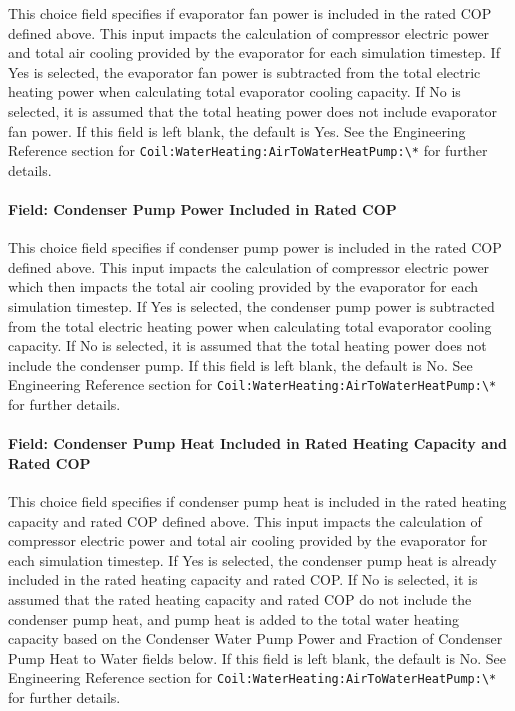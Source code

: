 This choice field specifies if evaporator fan power is included in the rated COP defined above. This input impacts the calculation of compressor electric power and total air cooling provided by the evaporator for each simulation timestep. If Yes is selected, the evaporator fan power is subtracted from the total electric heating power when calculating total evaporator cooling capacity. If No is selected, it is assumed that the total heating power does not include evaporator fan power. If this field is left blank, the default is Yes. See the Engineering Reference section for \lstinline!Coil:WaterHeating:AirToWaterHeatPump:\*! for further details.

\paragraph{Field: Condenser Pump Power Included in Rated COP}\label{field-condenser-pump-power-included-in-rated-cop}

This choice field specifies if condenser pump power is included in the rated COP defined above. This input impacts the calculation of compressor electric power which then impacts the total air cooling provided by the evaporator for each simulation timestep. If Yes is selected, the condenser pump power is subtracted from the total electric heating power when calculating total evaporator cooling capacity. If No is selected, it is assumed that the total heating power does not include the condenser pump. If this field is left blank, the default is No. See Engineering Reference section for \lstinline!Coil:WaterHeating:AirToWaterHeatPump:\*! for further details.

\paragraph{Field: Condenser Pump Heat Included in Rated Heating Capacity and Rated COP}\label{field-condenser-pump-heat-included-in-rated-heating-capacity-and-rated-cop}

This choice field specifies if condenser pump heat is included in the rated heating capacity and rated COP defined above. This input impacts the calculation of compressor electric power and total air cooling provided by the evaporator for each simulation timestep. If Yes is selected, the condenser pump heat is already included in the rated heating capacity and rated COP. If No is selected, it is assumed that the rated heating capacity and rated COP do not include the condenser pump heat, and pump heat is added to the total water heating capacity based on the Condenser Water Pump Power and Fraction of Condenser Pump Heat to Water fields below. If this field is left blank, the default is No. See Engineering Reference section for \lstinline!Coil:WaterHeating:AirToWaterHeatPump:\*! for further details.

